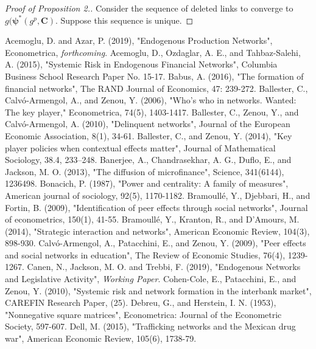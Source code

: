\documentclass[12pt]{article}
\theoremstyle{definition}
\begin{document}
\begin{proof}[Proof of Proposition 2.]
	Consider the sequence of deleted links to converge to $g(\bm{\psi}^*(g^p, \bm{C})$.
	Suppose this sequence is unique.
\end{proof}


\begin{thebibliography}{99}
	Acemoglu, D. and Azar, P. (2019),
	"Endogenous Production Networks",
	Econometrica, \textit{forthcoming}.
\bibitem{}
	Acemoglu, D., Ozdaglar, A. E., and Tahbaz-Salehi, A. (2015),
	"Systemic Risk in Endogenous Financial Networks",
	Columbia Business School Research Paper No. 15-17.
	Babus, A. (2016),
	"The formation of financial networks",
	The RAND Journal of Economics, 47: 239-272.
	Ballester, C., Calv\'{o}‐Armengol, A., and Zenou, Y. (2006),
	"Who's who in networks. Wanted: The key player,"
	Econometrica, 74(5), 1403-1417.
	Ballester, C., Zenou, Y., and Calv\'{o}-Armengol, A. (2010),
	"Delinquent networks",
	Journal of the European Economic Association, 8(1), 34-61.
	Ballester, C., and Zenou, Y. (2014),
	"Key player policies when contextual effects matter",
	Journal of Mathematical Sociology, 38.4, 233–248.
\bibitem{}
	Banerjee, A., Chandrasekhar, A. G., Duflo, E., and Jackson, M. O. (2013),
	"The diffusion of microfinance",
	Science, 341(6144), 1236498.
	Bonacich, P. (1987),
	"Power and centrality: A family of measures",
	American journal of sociology, 92(5), 1170-1182.
\bibitem{}
	Bramoull\'{e}, Y., Djebbari, H., and Fortin, B. (2009),
	"Identification of peer effects through social networks",
	Journal of econometrics, 150(1), 41-55.
\bibitem{}
	Bramoull\'{e}, Y., Kranton, R., and D'Amours, M. (2014),
	"Strategic interaction and networks",
	American Economic Review, 104(3), 898-930.
\bibitem{}
	Calv\'{o}-Armengol, A., Patacchini, E., and Zenou, Y. (2009),
	"Peer effects and social networks in education",
	The Review of Economic Studies, 76(4), 1239-1267.
	Canen, N., Jackson, M. O. and Trebbi, F. (2019),
	"Endogenous Networks and Legislative Activity",
	\textit{Working Paper}.
\bibitem{}
	Cohen-Cole, E., Patacchini, E., and Zenou, Y. (2010),
	"Systemic risk and network formation in the interbank market",
	CAREFIN Research Paper, (25).
	Debreu, G., and Herstein, I. N. (1953),
	"Nonnegative square matrices",
	Econometrica: Journal of the Econometric Society, 597-607.
\bibitem{}
	Dell, M. (2015),
	"Trafficking networks and the Mexican drug war",
	American Economic Review, 105(6), 1738-79.

\end{thebibliography}
\end{document}
